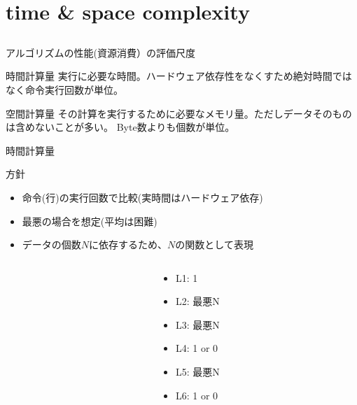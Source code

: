\documentclass{beamer}
\subtitle{}
\begin{document}
\begin{frame}[fragile]{}
\titlepage
\end{frame}

\section{time \& space complexity}		%
\subsection{}

\begin{frame}[fragile]{アルゴリズムの性能(資源消費）の評価尺度}{}
\begin{block}{時間計算量}
実行に必要な時間。ハードウェア依存性をなくすため絶対時間ではなく命令実行回数が単位。
\end{block}
\begin{block}{空間計算量}
その計算を実行するために必要なメモリ量。ただしデータそのものは含めないことが多い。
Byte数よりも個数が単位。
\end{block}
\end{frame}

\begin{frame}[fragile]{時間計算量}{}
\begin{block}{方針}
\begin{itemize}%
\item 命令(行)の実行回数で比較(実時間はハードウェア依存)
\item 最悪の場合を想定(平均は困難)
\item データの個数$N$に依存するため、$N$の関数として表現
\end{itemize}
\end{block}

\begin{columns}
\begin{column}{0.7\textwidth}
\end{column}
\begin{column}{0.25\textwidth}

\begin{itemize}%
\item L1: 1
\item L2: 最悪N
\item L3: 最悪N
\item L4: 1 or 0
\item L5: 最悪N
\item L6: 1 or 0
\end{itemize}
\end{column}
\end{columns}
\end{frame}
\end{document}
